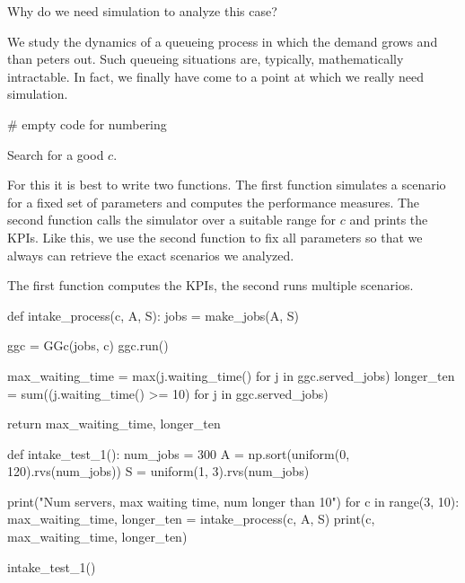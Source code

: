 \begin{exercise}
  Why do we need simulation to analyze this case?
\begin{solution}
    We study the dynamics of a queueing process in which the demand grows and than peters out. Such queueing situations are, typically, mathematically intractable. In fact, we finally have come to a point at which we really need simulation.
\begin{pyverbatim}
# empty code for numbering
\end{pyverbatim}
  \end{solution}
\end{exercise}


\begin{exercise}
  Search for a good $c$.
\begin{hint}
  For this it is best to write two functions. The first function simulates a scenario for a fixed set of parameters and computes the performance measures. The second  function calls the simulator over a suitable range for $c$ and prints the KPIs. Like this, we use  the second function to fix all parameters so that we always can retrieve the exact scenarios we analyzed.
\end{hint}

\begin{solution}
The first function computes the KPIs, the second runs multiple scenarios.

\begin{pyverbatim}
def intake_process(c, A, S):
    jobs = make_jobs(A, S)

    ggc = GGc(jobs, c)
    ggc.run()

    max_waiting_time = max(j.waiting_time() for j in ggc.served_jobs)
    longer_ten = sum((j.waiting_time() >= 10) for j in ggc.served_jobs)

    return max_waiting_time, longer_ten


def intake_test_1():
    num_jobs = 300
    A = np.sort(uniform(0, 120).rvs(num_jobs))
    S = uniform(1, 3).rvs(num_jobs)

    print("Num servers, max waiting time, num longer than 10")
    for c in range(3, 10):
        max_waiting_time, longer_ten = intake_process(c, A, S)
        print(c, max_waiting_time, longer_ten)


intake_test_1()
\end{pyverbatim}
\end{solution}
\end{exercise}


